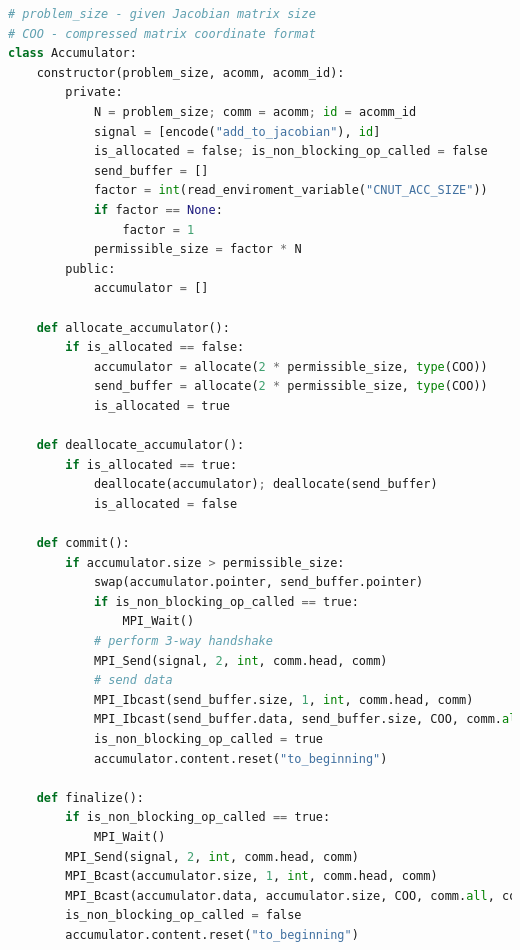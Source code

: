 \begin{minipage}{\linewidth}
\begin{lstlisting}[language=python, caption={Pseudocode of an auxiliary \textit{Accumulator} class}, frame=single, label={lst:bench:auxiliary-subroutines}]
# problem_size - given Jacobian matrix size
# COO - compressed matrix coordinate format
class Accumulator:
	constructor(problem_size, acomm, acomm_id):
		private:
			N = problem_size; comm = acomm; id = acomm_id
			signal = [encode("add_to_jacobian"), id]
			is_allocated = false; is_non_blocking_op_called = false
			send_buffer = []
			factor = int(read_enviroment_variable("CNUT_ACC_SIZE"))
			if factor == None:
				factor = 1	
			permissible_size = factor * N	
		public: 
			accumulator = []
		
	def allocate_accumulator():
		if is_allocated == false:
			accumulator = allocate(2 * permissible_size, type(COO))			
			send_buffer = allocate(2 * permissible_size, type(COO))
			is_allocated = true

	def deallocate_accumulator():
		if is_allocated == true:
			deallocate(accumulator); deallocate(send_buffer)
			is_allocated = false
	
	def commit():
		if accumulator.size > permissible_size:
			swap(accumulator.pointer, send_buffer.pointer)
			if is_non_blocking_op_called == true:
				MPI_Wait()
			# perform 3-way handshake
			MPI_Send(signal, 2, int, comm.head, comm)
			# send data
			MPI_Ibcast(send_buffer.size, 1, int, comm.head, comm)
			MPI_Ibcast(send_buffer.data, send_buffer.size, COO, comm.all, comm)
			is_non_blocking_op_called = true
			accumulator.content.reset("to_beginning")
					
	def finalize():
		if is_non_blocking_op_called == true:
			MPI_Wait()
		MPI_Send(signal, 2, int, comm.head, comm)
		MPI_Bcast(accumulator.size, 1, int, comm.head, comm)
		MPI_Bcast(accumulator.data, accumulator.size, COO, comm.all, comm)
		is_non_blocking_op_called = false
		accumulator.content.reset("to_beginning")
\end{lstlisting}
\end{minipage}




